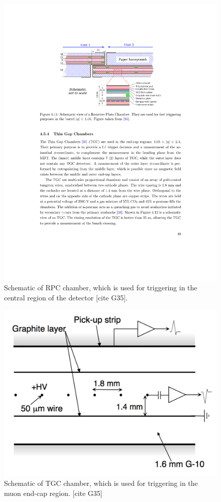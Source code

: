 \begin{figure}[h!]
  \centering
  \includegraphics[width=\hsize]{figures/Detector/muon_rpc.pdf}
  \caption{Schematic of RPC chamber, which is used for triggering in the central region of the detector [cite G35].} 
  \label{fig:muon_rpc}
\end{figure}
\FloatBarrier



\begin{figure}[h!]
  \centering
  \includegraphics[width=\hsize]{figures/Detector/muon_tgc.pdf}
  \caption{Schematic of TGC chamber, which is used for triggering in the muon end-cap region. [cite G35]} 
  \label{fig:muon_tgc}
\end{figure}
\FloatBarrier

